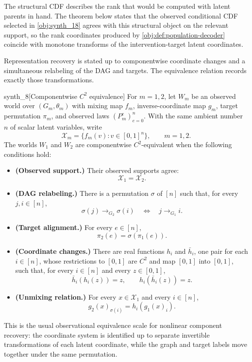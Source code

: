 The structural CDF describes the rank that would be computed with latent parents in hand. The theorem below states that the observed conditional CDF selected in \cref{obj:synth_18} agrees with this structural object on the relevant support, so the rank coordinates produced by \cref{obj:def:population-decoder} coincide with monotone transforms of the intervention-target latent coordinates.

Representation recovery is stated up to componentwise coordinate changes and a simultaneous relabeling of the DAG and targets. The equivalence relation records exactly those transformations.

\begin{definitionv}{synth_8}[Componentwise \(C^2\) equivalence]
For \(m=1,2\), let \(W_m\) be an observed world over \((G_m,\theta_m)\) with mixing map \(f_m\), inverse-coordinate map \(g_m\), target permutation \(\pi_m\), and observed laws \((P_m^e)_{e=0}^n\). With the same ambient number \(n\) of scalar latent variables, write
\[
\mathcal X_m=\{f_m(v):v\in[0,1]^n\},\qquad m=1,2.
\]
The worlds \(W_1\) and \(W_2\) are componentwise \(C^2\)-equivalent when the following conditions hold:
\begin{itemize}
\item \textbf{(Observed support.)} Their observed supports agree:
\[
\mathcal X_1=\mathcal X_2.
\]
\item \textbf{(DAG relabeling.)} There is a permutation \(\sigma\) of \([n]\) such that, for every \(j,i\in[n]\),
\[
\sigma(j)\to_{G_2}\sigma(i)
\quad\Longleftrightarrow\quad
j\to_{G_1} i.
\]
\item \textbf{(Target alignment.)} For every \(e\in[n]\),
\[
\pi_2(e)=\sigma(\pi_1(e)).
\]
\item \textbf{(Coordinate changes.)} There are real functions \(h_i\) and \(\bar h_i\), one pair for each \(i\in[n]\), whose restrictions to \([0,1]\) are \(C^2\) and map \([0,1]\) into \([0,1]\), such that, for every \(i\in[n]\) and every \(z\in[0,1]\),
\[
\bar h_i(h_i(z))=z,
\qquad
h_i(\bar h_i(z))=z.
\]
\item \textbf{(Unmixing relation.)} For every \(x\in\mathcal X_1\) and every \(i\in[n]\),
\[
g_2(x)_{\sigma(i)}
=
h_i\!\left(g_1(x)_i\right).
\]
\end{itemize}
\end{definitionv}

This is the usual observational equivalence scale for nonlinear component recovery: the coordinate system is identified up to separate invertible transformations of each latent coordinate, while the graph and target labels move together under the same permutation.

